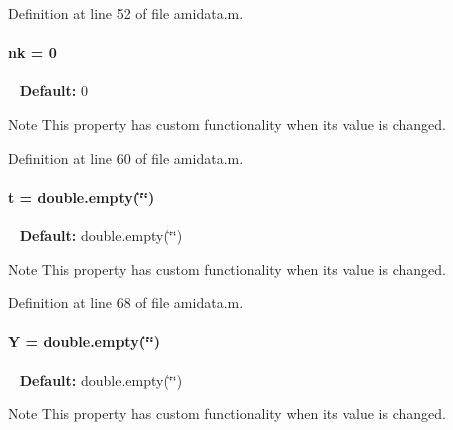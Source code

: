 Definition at line 52 of file amidata.\+m.

\hypertarget{classamidata_afd6bea572754e0c3c320664bdccf0200}{}
\paragraph[{nk}]{\setlength{\rightskip}{0pt plus 5cm}nk = 0}\label{classamidata_afd6bea572754e0c3c320664bdccf0200}
~\newline
{\bfseries Default\+:} 0

\begin{DoxyNote}{Note}
This property has custom functionality when its value is changed. 
\end{DoxyNote}


Definition at line 60 of file amidata.\+m.

\hypertarget{classamidata_aaccc9105df5383111407fd5b41255e23}{}
\paragraph[{t}]{\setlength{\rightskip}{0pt plus 5cm}t = double.\+empty(\char`\"{}\char`\"{})}\label{classamidata_aaccc9105df5383111407fd5b41255e23}
~\newline
{\bfseries Default\+:} double.\+empty(\char`\"{}\char`\"{})

\begin{DoxyNote}{Note}
This property has custom functionality when its value is changed. 
\end{DoxyNote}


Definition at line 68 of file amidata.\+m.

\hypertarget{classamidata_a0867f43e27585e019c13f7f4b7c4ab6b}{}
\paragraph[{Y}]{\setlength{\rightskip}{0pt plus 5cm}Y = double.\+empty(\char`\"{}\char`\"{})}\label{classamidata_a0867f43e27585e019c13f7f4b7c4ab6b}
~\newline
{\bfseries Default\+:} double.\+empty(\char`\"{}\char`\"{})

\begin{DoxyNote}{Note}
This property has custom functionality when its value is changed. 
\end{DoxyNote}


